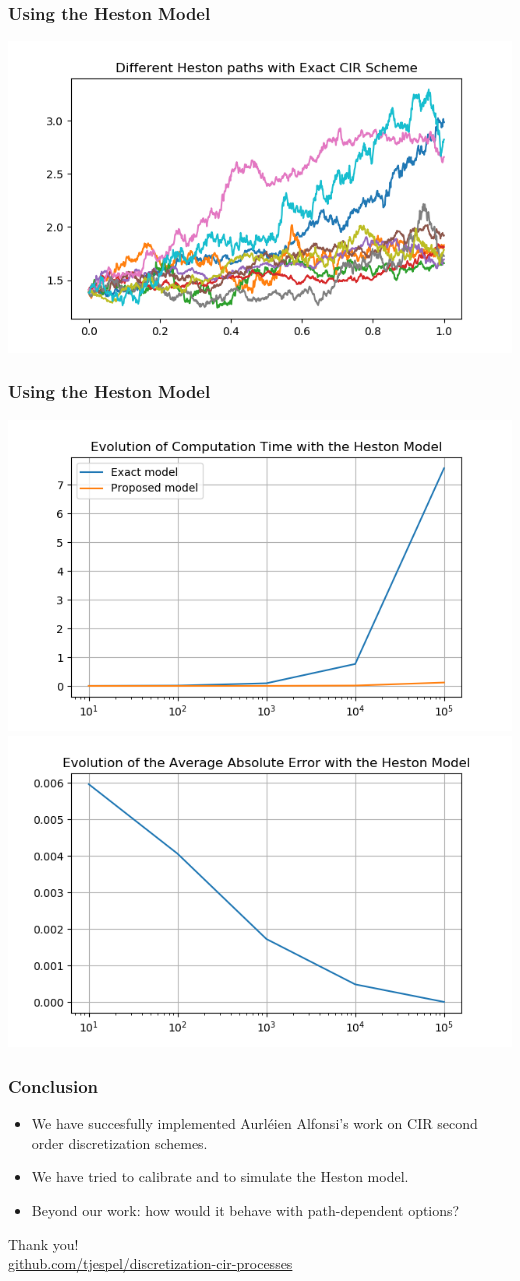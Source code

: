 \documentclass[12pt]{beamer}
\begin{document}
\begin{frame}
\frametitle{Using the Heston Model}
\includegraphics[width=\textwidth]{heston_exact1000.png}
\end{frame}

\begin{frame}
\frametitle{Using the Heston Model}
\includegraphics[width=.5\textwidth]{heston_time.png}
\includegraphics[width=.5\textwidth]{heston_error.png}
\end{frame}

\begin{frame}
\frametitle{Conclusion}
\begin{itemize}
  \item We have succesfully implemented Aurléien Alfonsi's work on CIR second order discretization schemes.
  \item We have tried to calibrate and to simulate the Heston model.
  \item Beyond our work: how would it behave with path-dependent options?
\end{itemize}
\end{frame}


\begin{frame}
\centering
{\Large Thank you!}
\\[1cm]
{\small\url{github.com/tjespel/discretization-cir-processes}}
\end{frame}
\end{document}
